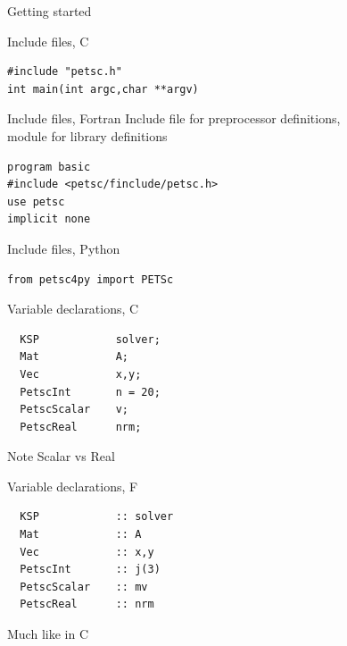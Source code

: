 
 {Getting started}

\begin{c}
\begin{numberedframe}{Include files, C}
\lstset{language=C}
\begin{lstlisting}
#include "petsc.h"
int main(int argc,char **argv)
\end{lstlisting}
\end{numberedframe}
\end{c}

\begin{fortran}
\lstset{language=Fortran}
\begin{numberedframe}{Include files, Fortran}
  Include file for preprocessor definitions,\\
  module for library definitions
\begin{lstlisting}
program basic
#include <petsc/finclude/petsc.h>
use petsc
implicit none
\end{lstlisting}
\end{numberedframe}
\end{fortran}

\begin{python}
\begin{numberedframe}{Include files, Python}
\lstset{language=Python}
\begin{lstlisting}
from petsc4py import PETSc
\end{lstlisting}
\end{numberedframe}
\end{python}

\lstset{language=C}
\begin{c}
\begin{numberedframe}{Variable declarations, C}
\begin{lstlisting}
  KSP            solver;
  Mat            A;
  Vec            x,y;
  PetscInt       n = 20;
  PetscScalar    v;
  PetscReal      nrm;
\end{lstlisting}
Note Scalar vs Real
\end{numberedframe}
\end{c}

\lstset{language=Fortran}
\begin{fortran}
\begin{numberedframe}{Variable declarations, F}
\begin{lstlisting}
  KSP            :: solver
  Mat            :: A
  Vec            :: x,y
  PetscInt       :: j(3)
  PetscScalar    :: mv
  PetscReal      :: nrm
\end{lstlisting}
Much like in C
\end{numberedframe}
\end{fortran}

